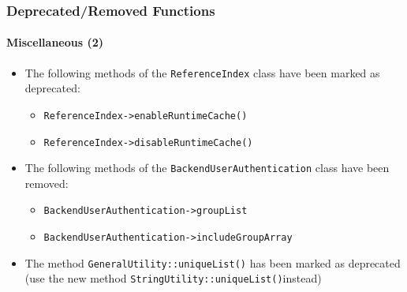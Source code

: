 %

\begin{frame}[fragile]
	\frametitle{Deprecated/Removed Functions}
	\framesubtitle{Miscellaneous (2)}

	\begin{itemize}
		\item The following methods of the \texttt{ReferenceIndex} class have been marked as deprecated:
			\begin{itemize}\smaller
				\item \texttt{ReferenceIndex->enableRuntimeCache()}
				\item \texttt{ReferenceIndex->disableRuntimeCache()}
			\end{itemize}\normalsize

		\item The following methods of the \texttt{BackendUserAuthentication} class have been removed:
			\begin{itemize}\smaller
				\item \texttt{BackendUserAuthentication->groupList}
				\item \texttt{BackendUserAuthentication->includeGroupArray}
			\end{itemize}\normalsize

		\item The method \texttt{GeneralUtility::uniqueList()} has been marked as deprecated
			(use the new method \smaller\texttt{StringUtility::uniqueList()}\normalsize instead)

	\end{itemize}

\end{frame}

